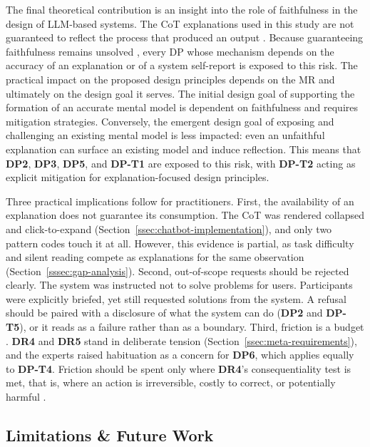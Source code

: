 The final theoretical contribution is an insight into the role of faithfulness in the design of \ac{LLM}-based systems. The \ac{CoT} explanations used in this study are not guaranteed to reflect the process that produced an output \parencite{Lyu2023}. Because guaranteeing faithfulness remains unsolved \parencite{Tutek2025}, every \ac{DP} whose mechanism depends on the accuracy of an explanation or of a system self-report is exposed to this risk. The practical impact on the proposed design principles depends on the \ac{MR} and ultimately on the design goal it serves. The initial design goal of supporting the formation of an accurate mental model is dependent on faithfulness and requires mitigation strategies. Conversely, the emergent design goal of exposing and challenging an existing mental model is less impacted: even an unfaithful explanation can surface an existing model and induce reflection. This means that \textbf{DP2}, \textbf{DP3}, \textbf{DP5}, and \textbf{DP-T1} are exposed to this risk, with \textbf{DP-T2} acting as explicit mitigation for explanation-focused design principles.

Three practical implications follow for practitioners. First, the availability of an explanation does not guarantee its consumption. The \ac{CoT} was rendered collapsed and click-to-expand (Section~\ref{ssec:chatbot-implementation}), and only two pattern codes touch it at all. However, this evidence is partial, as task difficulty and silent reading compete as explanations for the same observation (Section~\ref{sssec:gap-analysis}). Second, out-of-scope requests should be rejected clearly. The system was instructed not to solve problems for users. Participants were explicitly briefed, yet still requested solutions from the system. A refusal should be paired with a disclosure of what the system can do (\textbf{DP2} and \textbf{DP-T5}), or it reads as a failure rather than as a boundary. Third, friction is a budget \parencite[cf.][]{Weisz2025}. \textbf{DR4} and \textbf{DR5} stand in deliberate tension (Section~\ref{ssec:meta-requirements}), and the experts raised habituation as a concern for \textbf{DP6}, which applies equally to \textbf{DP-T4}. Friction should be spent only where \textbf{DR4}'s consequentiality test is met, that is, where an action is irreversible, costly to correct, or potentially harmful \parencite[cf.][]{Buinca2021}.

\subsection{Limitations \& Future Work} \label{ssec:limitations-future-work}


